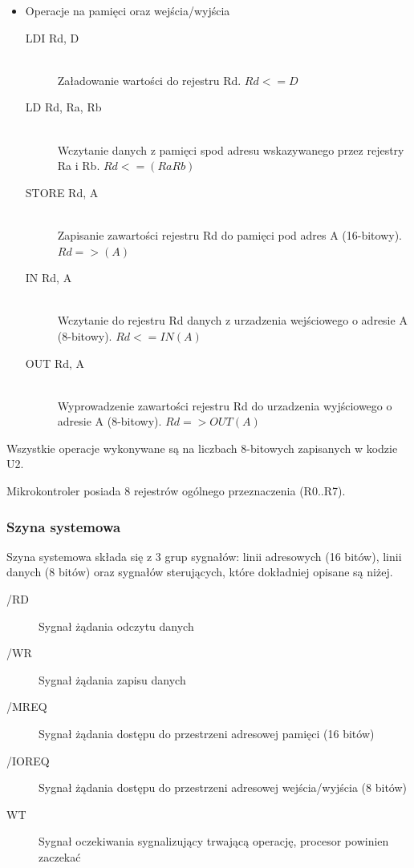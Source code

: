 \documentclass[a4paper,12pt]{report}
\begin{document}
\begin{itemize}
\item Operacje na pamięci oraz wejścia/wyjścia
\begin{description}
\item[LDI Rd, D] \hfill \\
Załadowanie wartości do rejestru Rd. $Rd <= D$
\item[LD Rd, Ra, Rb] \hfill \\
Wczytanie danych z pamięci spod adresu wskazywanego przez rejestry Ra i Rb. $Rd <= (RaRb)$
\item[STORE Rd, A] \hfill \\
Zapisanie zawartości rejestru Rd do pamięci pod adres A (16-bitowy). $Rd => (A)$
\item[IN Rd, A] \hfill \\
Wczytanie do rejestru Rd danych z urzadzenia wejściowego o adresie A (8-bitowy). $Rd <= IN(A)$
\item[OUT Rd, A] \hfill \\
Wyprowadzenie zawartości rejestru Rd do urzadzenia wyjściowego o adresie A (8-bitowy). $Rd => OUT(A)$
\end{description}

\end{itemize}

Wszystkie operacje wykonywane są na liczbach 8-bitowych zapisanych w kodzie U2.

Mikrokontroler posiada 8 rejestrów ogólnego przeznaczenia (R0..R7).

\subsubsection{Szyna systemowa}

Szyna systemowa składa się z 3 grup sygnałów: linii adresowych (16 bitów), linii danych (8 bitów) oraz sygnałów sterujących, które dokładniej opisane są niżej.
\begin{description}
\item[/RD] Sygnał żądania odczytu danych
\item[/WR] Sygnał żądania zapisu danych
\item[/MREQ] Sygnał żądania dostępu do przestrzeni adresowej pamięci (16 bitów)
\item[/IOREQ] Sygnał żądania dostępu do przestrzeni adresowej wejścia/wyjścia (8 bitów)
\item[WT] Sygnał oczekiwania sygnalizujący trwającą operację, procesor powinien zaczekać
\end{description}
\end{document}
